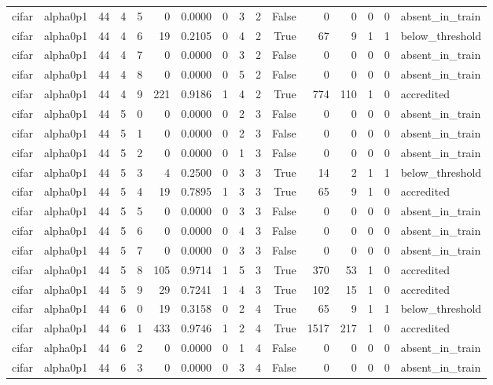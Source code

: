 \begin{tabular}{llrrrrrrrrrrrrrl}
cifar & alpha0p1 & 44 & 4 & 5 & 0 & 0.0000 & 0 & 3 & 2 & False & 0 & 0 & 0 & 0 & absent\_in\_train \\
cifar & alpha0p1 & 44 & 4 & 6 & 19 & 0.2105 & 0 & 4 & 2 & True & 67 & 9 & 1 & 1 & below\_threshold \\
cifar & alpha0p1 & 44 & 4 & 7 & 0 & 0.0000 & 0 & 3 & 2 & False & 0 & 0 & 0 & 0 & absent\_in\_train \\
cifar & alpha0p1 & 44 & 4 & 8 & 0 & 0.0000 & 0 & 5 & 2 & False & 0 & 0 & 0 & 0 & absent\_in\_train \\
cifar & alpha0p1 & 44 & 4 & 9 & 221 & 0.9186 & 1 & 4 & 2 & True & 774 & 110 & 1 & 0 & accredited \\
cifar & alpha0p1 & 44 & 5 & 0 & 0 & 0.0000 & 0 & 2 & 3 & False & 0 & 0 & 0 & 0 & absent\_in\_train \\
cifar & alpha0p1 & 44 & 5 & 1 & 0 & 0.0000 & 0 & 2 & 3 & False & 0 & 0 & 0 & 0 & absent\_in\_train \\
cifar & alpha0p1 & 44 & 5 & 2 & 0 & 0.0000 & 0 & 1 & 3 & False & 0 & 0 & 0 & 0 & absent\_in\_train \\
cifar & alpha0p1 & 44 & 5 & 3 & 4 & 0.2500 & 0 & 3 & 3 & True & 14 & 2 & 1 & 1 & below\_threshold \\
cifar & alpha0p1 & 44 & 5 & 4 & 19 & 0.7895 & 1 & 3 & 3 & True & 65 & 9 & 1 & 0 & accredited \\
cifar & alpha0p1 & 44 & 5 & 5 & 0 & 0.0000 & 0 & 3 & 3 & False & 0 & 0 & 0 & 0 & absent\_in\_train \\
cifar & alpha0p1 & 44 & 5 & 6 & 0 & 0.0000 & 0 & 4 & 3 & False & 0 & 0 & 0 & 0 & absent\_in\_train \\
cifar & alpha0p1 & 44 & 5 & 7 & 0 & 0.0000 & 0 & 3 & 3 & False & 0 & 0 & 0 & 0 & absent\_in\_train \\
cifar & alpha0p1 & 44 & 5 & 8 & 105 & 0.9714 & 1 & 5 & 3 & True & 370 & 53 & 1 & 0 & accredited \\
cifar & alpha0p1 & 44 & 5 & 9 & 29 & 0.7241 & 1 & 4 & 3 & True & 102 & 15 & 1 & 0 & accredited \\
cifar & alpha0p1 & 44 & 6 & 0 & 19 & 0.3158 & 0 & 2 & 4 & True & 65 & 9 & 1 & 1 & below\_threshold \\
cifar & alpha0p1 & 44 & 6 & 1 & 433 & 0.9746 & 1 & 2 & 4 & True & 1517 & 217 & 1 & 0 & accredited \\
cifar & alpha0p1 & 44 & 6 & 2 & 0 & 0.0000 & 0 & 1 & 4 & False & 0 & 0 & 0 & 0 & absent\_in\_train \\
cifar & alpha0p1 & 44 & 6 & 3 & 0 & 0.0000 & 0 & 3 & 4 & False & 0 & 0 & 0 & 0 & absent\_in\_train \\

\end{tabular}
